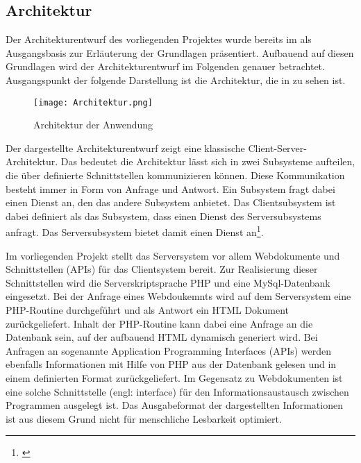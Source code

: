 \subsection{Architektur}
\label{sec:Architektur}

Der Architekturentwurf des vorliegenden Projektes wurde bereits im  als Ausgangsbasis zur Erläuterung der Grundlagen präsentiert. Aufbauend auf diesen Grundlagen wird der Architekturentwurf im Folgenden genauer betrachtet. Ausgangspunkt der folgende Darstellung ist die Architektur, die in  zu sehen ist.

\begin{figure}[htb]
\centering
\texttt{[image: Architektur.png]}
\caption[Architektur der Anwendung]{Architektur der
Anwendung\protect\footnotemark}
\label{fig:Architektur}
\end{figure}

Der dargestellte Architekturentwurf zeigt eine klassische Client-Server-Architektur. Das bedeutet die Architektur lässt sich in zwei Subsysteme aufteilen, die über definierte Schnittstellen kommunizieren können. Diese Kommunikation besteht immer in Form von Anfrage und Antwort. Ein Subsystem fragt dabei einen Dienst an, den das andere Subsystem anbietet. Das Clientsubsystem ist dabei definiert als das Subsystem, dass einen Dienst des Serversubsystems anfragt. Das Serversubsystem bietet damit einen Dienst an\footnote{\citet[S.~177]{rautenstrauch2002}}.

Im vorliegenden Projekt stellt das Serversystem vor allem Webdokumente und Schnittstellen (APIs) für das Clientsystem bereit. Zur Realisierung dieser Schnittstellen wird die Serverskriptsprache PHP und eine MySql-Datenbank eingesetzt. Bei der Anfrage eines Webdoukemnts wird auf dem Serversystem eine PHP-Routine durchgeführt und als Antwort ein HTML Dokument zurückgeliefert. Inhalt der PHP-Routine kann dabei eine Anfrage an die Datenbank sein, auf der aufbauend HTML dynamisch generiert wird.
Bei Anfragen an sogenannte Application Programming Interfaces (APIs) werden ebenfalls Informationen mit Hilfe von PHP aus der Datenbank gelesen und in einem definierten Format zurückgeliefert. Im Gegensatz zu Webdokumenten ist eine solche Schnittstelle (engl: interface) für den Informationsaustausch zwischen Programmen ausgelegt ist. Das Ausgabeformat der dargestellten Informationen ist aus diesem Grund nicht für menschliche Lesbarkeit optimiert.

